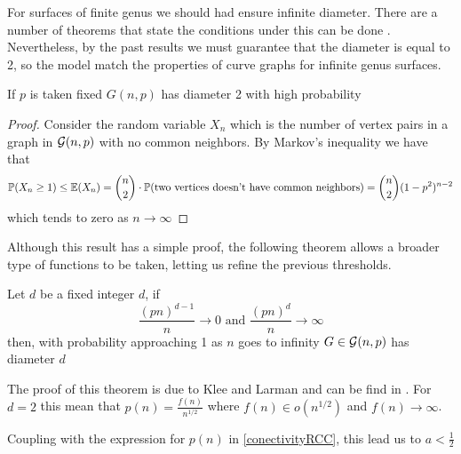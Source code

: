 For surfaces of finite genus we should had ensure infinite diameter. There are a number of theorems that state the conditions under this can be done \cite[Bollobás, p.259]{Bollobas}. Nevertheless, by the past results we must guarantee that the diameter is equal to 2, so the model match the properties of curve graphs for infinite genus surfaces.

\begin{theorem}
If $p$ is taken fixed $G(n,p)$ has diameter 2 with high probability 
\end{theorem}

\begin{proof}
Consider the random variable $X_{n}$ which is the number of vertex pairs in a graph in $\mathcal{G}(n,p)$ with no common neighbors. By Markov's inequality we have that
$$\mathbb{P}(X_{n} \geq 1)\leq \mathbb{E}(X_{n}) = \binom{n}{2} \cdot \mathbb{P}(\text{two vertices doesn't have common neighbors}) = \binom{n}{2} (1-p^{2})^{n-2}$$
which tends to zero as $n\to \infty$
\end{proof}

Although this result has a simple proof, the following theorem allows a broader type of functions to be taken, letting us refine the previous thresholds.

\begin{theorem}
Let $d$ be a fixed integer $d$, if 
$$\frac{(pn)^{d-1}}{n} \to 0 \text{ and } \frac{(pn)^{d}}{n} \to \infty $$
then, with probability approaching 1 as $n$ goes to infinity $G\in\mathcal{G}(n,p)$ has diameter $d$
\end{theorem}

The proof of this theorem is due to Klee and Larman and can be find in \cite{diameters}. For $d=2$ this mean that $p(n)= \frac{f(n)}{n^{1/2}}$ where $f(n)\in o(n^{1/2})$ and $f(n)\to \infty$.

Coupling with the expression for $p(n)$ in \ref{conectivityRCC}, this lead us to $a<\frac{1}{2}$




